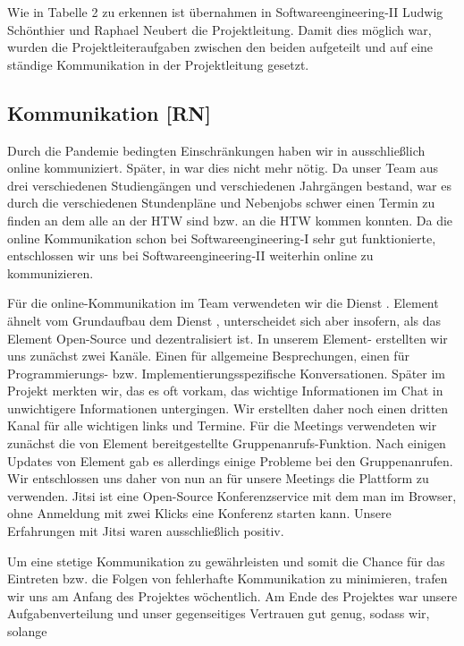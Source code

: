 \documentclass[10pt]{article}
\begin{document}
Wie in Tabelle 2 zu erkennen ist übernahmen in Softwareengineering-II Ludwig Schönthier und Raphael Neubert die 
Projektleitung. Damit dies möglich war, wurden die Projektleiteraufgaben zwischen den beiden aufgeteilt und auf eine 
ständige Kommunikation in der Projektleitung gesetzt.
\newpage
\subsection{Kommunikation [RN]}
Durch die Pandemie bedingten Einschränkungen haben wir in  ausschließlich online kommuniziert. Später, in  war dies nicht mehr nötig. Da unser Team aus drei verschiedenen
Studiengängen und verschiedenen Jahrgängen bestand, war es durch die verschiedenen Stundenpläne und Nebenjobs 
schwer einen Termin zu finden an dem alle an der HTW sind bzw. an die HTW kommen konnten. Da die online Kommunikation 
schon bei Softwareengineering-I sehr gut funktionierte, entschlossen wir uns bei Softwareengineering-II weiterhin online 
zu kommunizieren.\par
\medskip
Für die online-Kommunikation im Team verwendeten wir die Dienst . Element ähnelt vom Grundaufbau dem 
Dienst , unterscheidet sich aber insofern, als das Element Open-Source und dezentralisiert ist.
In unserem Element- erstellten wir uns zunächst zwei Kanäle. Einen für allgemeine Besprechungen, 
einen für  Programmierungs- bzw. Implementierungsspezifische Konversationen. Später im Projekt merkten wir, das 
es oft vorkam, das wichtige Informationen im Chat in unwichtigere Informationen untergingen. Wir erstellten
daher noch einen dritten Kanal für alle wichtigen links und Termine.
Für die Meetings verwendeten wir zunächst die von Element bereitgestellte Gruppenanrufs-Funktion.
Nach einigen Updates von Element gab es allerdings einige Probleme bei den Gruppenanrufen. Wir entschlossen 
uns daher von nun an für unsere Meetings die Plattform  zu verwenden.
Jitsi ist eine Open-Source Konferenzservice mit dem man im Browser, 
ohne Anmeldung mit zwei Klicks eine Konferenz starten kann. Unsere Erfahrungen mit Jitsi waren ausschließlich positiv.\par
\medskip
Um eine stetige Kommunikation zu gewährleisten und somit die Chance für das Eintreten bzw. die Folgen
von fehlerhafte Kommunikation zu minimieren, trafen wir uns am Anfang des Projektes wöchentlich. Am Ende 
des Projektes war unsere Aufgabenverteilung und unser gegenseitiges Vertrauen gut genug, sodass wir, solange
\end{document}
